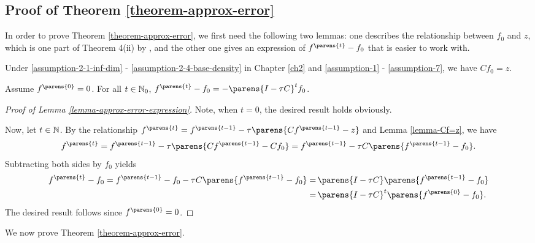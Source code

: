 \subsection{Proof of Theorem \ref{theorem-approx-error}}\label{proof-theorem-approx-error}

In order to prove Theorem \ref{theorem-approx-error}, we first need the following two lemmas: one describes the relationship between $f_0$ and $z$, which is one part of Theorem 4(ii) by \textcite{Sriperumbudur-density-estimation-inf-exp-family}, and the other one gives an expression of $f^{\parens{t}} - f_0$ that is easier to work with. 

\begin{lemma}\label{lemma-Cf=z}
	Under \ref{assumption-2-1-inf-dim} - \ref{assumption-2-4-base-density} in Chapter \ref{ch2} and \ref{assumption-1} - \ref{assumption-7}, we have $C f_0 = z$. 
\end{lemma}

\begin{lemma}\label{lemma-approx-error-expression}
	Assume $f^{\parens{0}} = 0$. For all $t \in \mathbb{N}_0$, $f^{\parens{t}} - f_0 = - \parens{I - \tau C}^{t} f_0$. 
\end{lemma}

\begin{proof}[Proof of Lemma \ref{lemma-approx-error-expression}]
	Note, when $t = 0$, the desired result holds obviously. 
	
	Now, let $t \in \mathbb{N}$. By the relationship $f^{\parens{t}} = f^{\parens{t-1}} - \tau \parens{C f^{\parens{t-1}} - z}$ and Lemma \ref{lemma-Cf=z}, we have 
	\begin{align*}
		f^{\parens{t}} = f^{\parens{t-1}} - \tau \parens{C f^{\parens{t-1}} - C f_0} = f^{\parens{t-1}} - \tau C \parens{f^{\parens{t-1}} - f_0}. 
	\end{align*}
	Subtracting both sides by $f_0$ yields 
	\begin{align*}
		f^{\parens{t}} - f_0 = f^{\parens{t-1}} - f_0 - \tau C \parens{f^{\parens{t-1}} - f_0} 
		= & \, \parens{I - \tau C} \parens{f^{\parens{t-1}} - f_0} \\ 
		= & \, \parens{I - \tau C}^{t} \parens{f^{\parens{0}} - f_0}. 
	\end{align*}
	The desired result follows since $f^{\parens{0}} = 0$. 
\end{proof}

We now prove Theorem \ref{theorem-approx-error}. 

